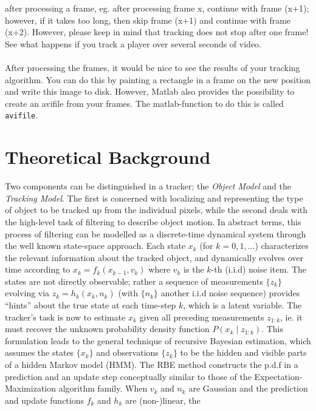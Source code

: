 \documentclass[a4paper,11pt]{article}
\begin{document}
		after processing a frame, eg. after processing frame x, continue with frame (x+1); however,
		if it takes too long, then skip frame (x+1) and continue with frame (x+2). However, please
		keep in mind that tracking does not stop after one frame! See what happens if you track a
		player over several seconds of video.
		\\ \\
		After processing the frames, it would be nice to see the results of your tracking algorithm.
		You can do this by painting a rectangle in a frame on the new position and write this image
		to disk. However, Matlab also provides the possibility to create an avifile from your frames.
		The matlab-function to do this is called \verb|avifile|. 

	\section*{Theoretical Background}
		Two components can be distinguished in a tracker; the \textit{Object Model}
		and the \textit{Tracking Model}. The first is concerned with localizing and
		representing the type of object to be tracked up from the individual pixels,
		while the second deals with the high-level task of filtering to describe object
		motion.
		In abstract terms, this process of filtering can be modelled as a discrete-time
		dynamical system through the well known state-space approach. Each state $x_k$
		(for $k=0, 1, ...$) characterizes the relevant information about the tracked
		object, and dynamically evolves over time according to $x_k = f_k(x_{k - 1}, v_k)$
		where $v_k$ is the $k$-th (i.i.d) noise item. The states are not directly observable;
		rather a sequence of measurements $\{z_k\}$ evolving via $z_k = h_k(x_k, n_k)$
		(with $\{n_k\}$ another i.i.d noise sequence) provides ``hints'' about the true
		state at each time-step $k$, which is a latent variable. The tracker's task
		is now to estimate $x_k$ given all preceding measurements $z_{1:k}$, ie. it
		must recover the unknown probability density function $P(x_k \mid z_{1:k})$.
		This formulation leads to the general technique of recursive Bayesian estimation,
		which assumes the states $\{x_k\}$ and observations $\{z_k\}$ to be the hidden
		and visible parts of a hidden Markov model (HMM). The RBE method constructs the
		p.d.f in a prediction and an update step conceptually similar to those of the
		Expectation-Maximization algorithm family. When $v_k$ and $n_k$ are Gaussian
		and the prediction and update functions $f_k$ and $h_k$ are (non-)linear, the
\end{document}
